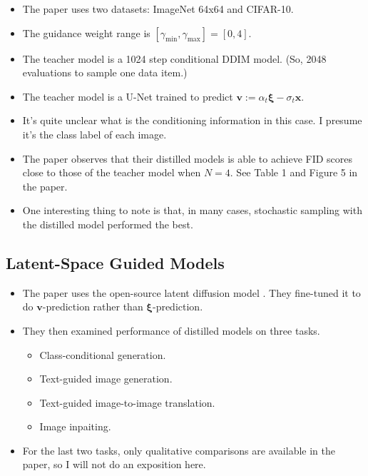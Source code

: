 \documentclass[10pt]{article}
\newcommand{\ve}[1]{\mathbf{#1}}
\newcommand{\ves}[1]{\boldsymbol{#1}}
\begin{document}
\begin{itemize}
  \item The paper uses two datasets: ImageNet 64x64 and CIFAR-10.
  
  \item The guidance weight range is $[\gamma_{\min}, \gamma_{\max}] = [0,4]$.
  
  \item The teacher model is a 1024 step conditional DDIM model. (So, 2048 evaluations to sample one data item.)
  
  \item The teacher model is a U-Net trained to predict $\ve{v} := \alpha_t \ves{\xi} - \sigma_t \ve{x}$.

  \item It's quite unclear what is the conditioning information in this case. I presume it's the class label of each image.
  
  \item The paper observes that their distilled models is able to achieve FID scores close to those of the teacher model when $N=4$. See Table 1 and Figure 5 in the paper.
  
  \item One interesting thing to note is that, in many cases, stochastic sampling with the distilled model performed the best.
\end{itemize}

\subsection{Latent-Space Guided Models}

\begin{itemize}
  \item The paper uses the open-source latent diffusion model \cite{Rombach:2021}. They fine-tuned it to do $\ve{v}$-prediction rather than $\ves{\xi}$-prediction.
  
  \item They then examined performance of distilled models on three tasks.
  \begin{itemize}
    \item Class-conditional generation.
    \item Text-guided image generation.
    \item Text-guided image-to-image translation.
    \item Image inpaiting.
  \end{itemize}

  \item For the last two tasks, only qualitative comparisons are available in the paper, so I will not do an exposition here.
\end{itemize}
\end{document}
